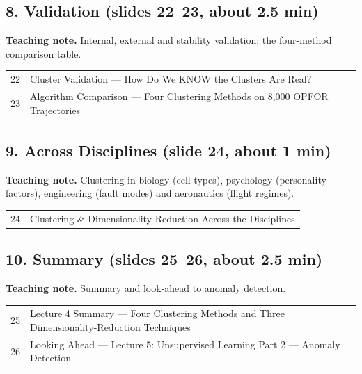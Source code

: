 \documentclass[11pt]{article}
\begin{document}
\subsection{8. Validation \normalfont\small\color{GreyN}(slides 22--23, about 2.5 min)}

\textbf{Teaching note.} Internal, external and stability validation; the four-method comparison table.

\begin{center}\small\renewcommand{\arraystretch}{1.1}\begin{tabularx}{\textwidth}{@{}r X@{}}22 & Cluster Validation --- How Do We KNOW the Clusters Are Real?\\
23 & Algorithm Comparison --- Four Clustering Methods on 8,000 OPFOR Trajectories\\\end{tabularx}\end{center}

\subsection{9. Across Disciplines \normalfont\small\color{GreyN}(slide 24, about 1 min)}

\textbf{Teaching note.} Clustering in biology (cell types), psychology (personality factors), engineering (fault modes) and aeronautics (flight regimes).

\begin{center}\small\renewcommand{\arraystretch}{1.1}\begin{tabularx}{\textwidth}{@{}r X@{}}24 & Clustering \& Dimensionality Reduction Across the Disciplines\\\end{tabularx}\end{center}

\subsection{10. Summary \normalfont\small\color{GreyN}(slides 25--26, about 2.5 min)}

\textbf{Teaching note.} Summary and look-ahead to anomaly detection.

\begin{center}\small\renewcommand{\arraystretch}{1.1}\begin{tabularx}{\textwidth}{@{}r X@{}}25 & Lecture 4 Summary --- Four Clustering Methods and Three Dimensionality-Reduction Techniques\\
26 & Looking Ahead --- Lecture 5: Unsupervised Learning Part 2 --- Anomaly Detection\\\end{tabularx}\end{center}
\end{document}
